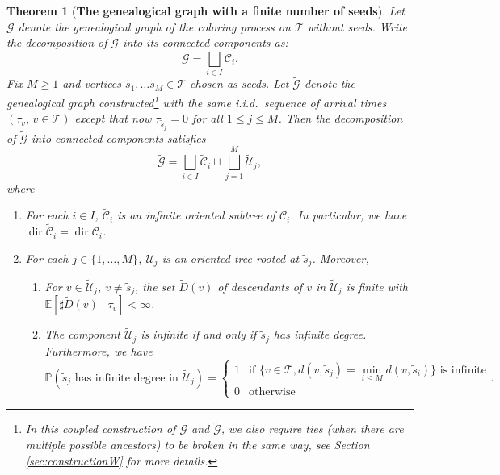 \documentclass[french]{article}
\newtheorem{theorem}{Theorem}
\newcommand{\E}{\mathbb{E}}
\renewcommand{\P}{\mathbb{P}}
\newcommand{\T}{\mathcal{T}}
\renewcommand{\dir}{\mathop{dir}}
\renewcommand{\1}{\mathds{1}}
\begin{document}
\begin{theorem}[\textbf{The genealogical graph with a finite number of seeds}]\label{thm:GwithSeeds}
Let $\mathcal G$ denote the genealogical graph of the coloring process on $\T$ without seeds. Write the decomposition of $\mathcal G$ into its connected components as:
$$
\mathcal G = \bigsqcup_{i \in I} \mathcal{C}_i.
$$
Fix $M\geq 1$ and vertices $\tilde{s}_1, \ldots \tilde{s}_M \in \T$ chosen as seeds. Let $\tilde{\mathcal{G}}$ denote the genealogical graph constructed\footnote{In this coupled construction of $\mathcal G$ and $ \tilde{\mathcal{G}}$, we also require ties (when there are multiple possible ancestors) to be broken in the same way, see Section \ref{sec:constructionW} for more details.} with the same i.i.d.\ sequence of arrival times $(\tau_v,\, v\in \T)$ except that now $\tau_{\tilde{s}_j}=0$ for all $1\le j\le M$. Then the decomposition of $\tilde{\mathcal{G}}$ into connected components satisfies
$$
\tilde{\mathcal G} = \bigsqcup_{i \in I} \tilde{\mathcal{C}}_i \sqcup \bigsqcup_{j = 1}^M\tilde{\mathcal{U}}_j,
$$
where 
\begin{enumerate}
    \item For each $i\in I$, $\tilde{\mathcal{C}}_i$ is an infinite oriented subtree of $\mathcal{C}_i$. In particular, we have $\dir \tilde{\mathcal{C}}_i = \dir \mathcal{C}_i$.

    \item For each $j\in \{1,\ldots, M\}$, $\tilde{\mathcal{U}}_j$ is an oriented tree rooted at $\tilde{s}_j$. Moreover, 
    \begin{enumerate}
        \item For $v \in \tilde{\mathcal{U}}_j$, $v \neq \tilde{s}_j$, the set $\tilde{D}(v)$ of descendants of $v$ in $\tilde{\mathcal{U}}_j$ is finite with $\E[\sharp\tilde{D}(v) \mid \tau_v] < \infty$.
\item The component $\tilde{\mathcal{U}}_j$ is infinite if and only if $\tilde{s}_j$ has infinite degree. Furthermore, we have 
$$
\P(\mbox{$\tilde{s}_j$ has infinite degree in $\tilde{\mathcal{U}}_j$})=
\begin{cases}
    1 & \mbox{if $\{v\in \T, d(v,\tilde{s}_j)=\min_{i\le M} d(v,\tilde{s}_i)\}$ is infinite}\\
    0 & \mbox{otherwise}
\end{cases}.
$$
\end{enumerate}    
\end{enumerate}
\end{theorem}
\end{document}

